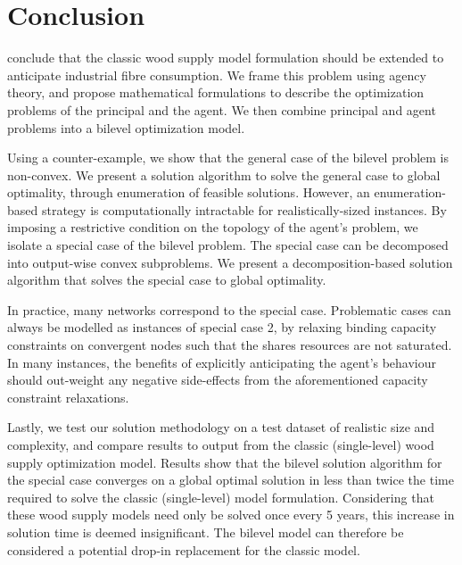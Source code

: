 \section{Conclusion}
\label{sec:conclusion2}

\citet{paradis2013risk} conclude that the classic wood supply model formulation should be extended to anticipate industrial fibre consumption. 
We frame this problem using agency theory, and propose mathematical formulations to describe the optimization problems of the principal and the agent. 
We then combine principal and agent problems into a bilevel optimization model. 

Using a counter-example, we show that the general case of the bilevel problem is non-convex.
We present a solution algorithm to solve the general case to global optimality, through enumeration of feasible solutions.
However, an enumeration-based strategy is computationally intractable for realistically-sized instances.
By imposing a restrictive condition on the topology of the agent's problem, we isolate a special case of the bilevel problem. The special case can be decomposed into output-wise convex subproblems.
We present a decomposition-based solution algorithm that solves the special case to global optimality.

In practice, many networks correspond to the special case. 
Problematic cases can always be modelled as instances of special case 2, by relaxing binding capacity constraints on convergent nodes such that the shares resources are not saturated.
In many instances, the benefits of explicitly anticipating the agent's behaviour should out-weight any negative side-effects from the aforementioned capacity constraint relaxations.

Lastly, we test our solution methodology on a test dataset of realistic size and complexity, and compare results to output from the classic (single-level) wood supply optimization model. 
Results show that the bilevel solution algorithm for the special case converges on a global optimal solution in less than twice the time required to solve the classic (single-level) model formulation.
Considering that these wood supply models need only be solved once every 5 years, this increase in solution time is deemed insignificant.
The bilevel model can therefore be considered a potential drop-in replacement for the classic model.  


